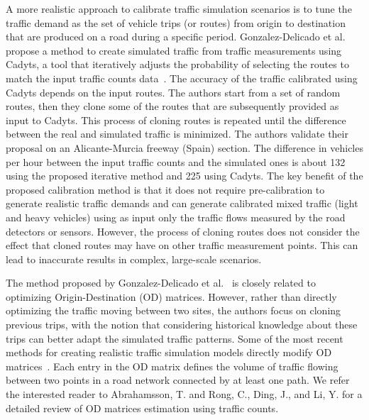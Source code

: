 A more realistic approach to calibrate traffic simulation scenarios is to tune the traffic demand as the set of vehicle trips (or routes) from origin to destination that are produced on a road during a specific period. Gonzalez-Delicado et al.~\cite{9606704} propose a method to create simulated traffic from traffic measurements using Cadyts, a tool that iteratively adjusts the probability of selecting the routes to match the input traffic counts data~\cite{behrisch_comparison_2022}. The accuracy of the traffic calibrated using Cadyts depends on the input routes. The authors start from a set of random routes, then they clone some of the routes that are subsequently provided as input to Cadyts. This process of cloning routes is repeated until the difference between the real and simulated traffic is minimized. The authors validate their proposal on an Alicante-Murcia freeway (Spain) section. The difference in vehicles per hour between the input traffic counts and the simulated ones is about 132 using the proposed iterative method and 225 using Cadyts. The key benefit of the proposed calibration method is that it does not require pre-calibration to generate realistic traffic demands and can generate calibrated mixed traffic (light and heavy vehicles) using as input only the traffic flows measured by the road detectors or sensors. However, the process of cloning routes does not consider the effect that cloned routes may have on other traffic measurement points. This can lead to inaccurate results in complex, large-scale scenarios.

The method proposed by Gonzalez-Delicado et al.~\cite{9606704} is closely related to optimizing Origin-Destination (OD) matrices. However, rather than directly optimizing the traffic moving between two sites, the authors focus on cloning previous trips, with the notion that considering historical knowledge about these trips can better adapt the simulated traffic patterns. Some of the most recent methods for creating realistic traffic simulation models directly modify OD matrices~\cite{zhang_efficient_2017}. Each entry in the OD matrix defines the volume of traffic flowing between two points in a road network connected by at least one path. We refer the interested reader to Abrahamsson, T. \cite{abrahamsson1998estimation} and Rong, C., Ding, J., and Li, Y.\cite{rong2023interdisciplinary} for a detailed review of OD matrices estimation using traffic counts.

